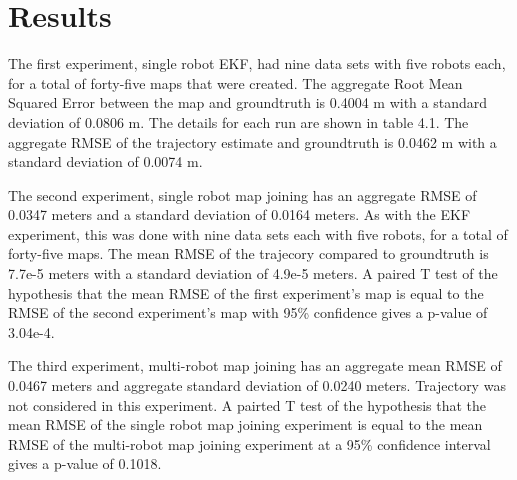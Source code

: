 \documentclass[12pt]{report}
\begin{document}
\chapter{Results}

The first experiment, single robot EKF, had nine data sets with five robots each, for a total of forty-five maps that were created.  The aggregate Root Mean Squared Error between the map and groundtruth is 0.4004 m with a standard deviation of 0.0806 m.  The details for each run are shown in table 4.1.  The aggregate RMSE of the trajectory estimate and groundtruth is 0.0462 m with a standard deviation of 0.0074 m.  

The second experiment, single robot map joining has an aggregate RMSE of 0.0347 meters and a standard deviation of 0.0164 meters.  As with the EKF experiment, this was done with nine data sets each with five robots, for a total of forty-five maps.  The mean RMSE of the trajecory compared to groundtruth is 7.7e-5 meters with a standard deviation of 4.9e-5 meters.  A paired T test of the hypothesis that the mean RMSE of the first experiment's map is equal to the RMSE of the second experiment's map with 95\% confidence gives a p-value of 3.04e-4.  

The third experiment, multi-robot map joining has an aggregate mean RMSE of 0.0467 meters and aggregate standard deviation of 0.0240 meters.   Trajectory was not considered in this experiment.  A pairted T test of the hypothesis that the mean RMSE of the single robot map joining experiment is equal to the mean RMSE of the multi-robot map joining experiment at a 95\% confidence interval gives a p-value of 0.1018.
\end{document}
